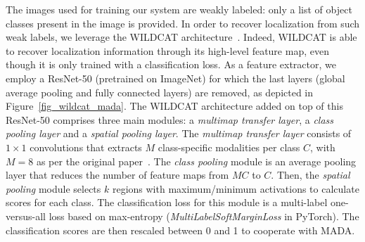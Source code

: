 \documentclass[letterpaper, 10 pt, conference]{ieeeconf}  %
\begin{document}
The images used for training our system are weakly labeled: only a list of object classes present in the image is provided. In order to recover localization from such weak labels, we leverage the WILDCAT architecture~\cite{durand2017wildcat}. Indeed, WILDCAT is able to recover localization information through its high-level feature map, even though it is only trained with a classification loss. %
As a feature extractor, we employ a ResNet-50 (pretrained on ImageNet) for which the last layers (global average pooling and fully connected layers) are removed, as depicted in Figure~\ref{fig_wildcat_mada}. The WILDCAT architecture added on top of this ResNet-50 comprises three main modules: a \textit{multimap transfer layer}, a \textit{class pooling layer} and a \textit{spatial pooling layer}. The \textit{multimap transfer layer} consists of $1 \times 1$ convolutions that extracts $M$ class-specific modalities per class $C$, with $M=8$ as per the original paper~\cite{durand2017wildcat}. The \textit{class pooling} module is an average pooling layer that reduces the number of feature maps from $MC$ to $C$. Then, the \textit{spatial pooling} module selects $k$ regions with maximum/minimum activations to calculate scores for each class. The classification loss for this module is a multi-label one-versus-all loss based on max-entropy (\textit{MultiLabelSoftMarginLoss} in PyTorch). The classification scores are then rescaled between 0 and 1 to cooperate with MADA.
\end{document}
